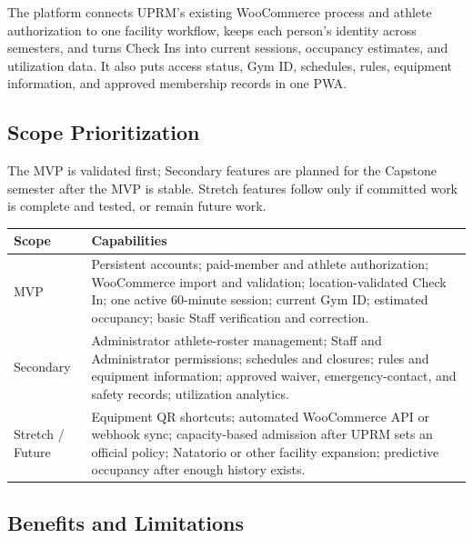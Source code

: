 \documentclass[11pt,letterpaper]{article}
\begin{document}
The platform connects UPRM's existing WooCommerce process and athlete authorization to one facility workflow, keeps each person's identity across semesters, and turns Check Ins into current sessions, occupancy estimates, and utilization data. It also puts access status, Gym ID, schedules, rules, equipment information, and approved membership records in one PWA.

\subsection{Scope Prioritization}

The MVP is validated first; Secondary features are planned for the Capstone semester after the MVP is stable. Stretch features follow only if committed work is complete and tested, or remain future work.

\begin{center}
\small
\begin{tabularx}{0.95\textwidth}{L{2.4cm} X}
\toprule
\textbf{Scope} & \textbf{Capabilities} \\
\midrule
MVP & Persistent accounts; paid-member and athlete authorization; WooCommerce import and validation; location-validated Check In; one active 60-minute session; current Gym ID; estimated occupancy; basic Staff verification and correction. \\
\addlinespace
Secondary & Administrator athlete-roster management; Staff and Administrator permissions; schedules and closures; rules and equipment information; approved waiver, emergency-contact, and safety records; utilization analytics. \\
\addlinespace
Stretch / Future & Equipment QR shortcuts; automated WooCommerce API or webhook sync; capacity-based admission after UPRM sets an official policy; Natatorio or other facility expansion; predictive occupancy after enough history exists. \\
\bottomrule
\end{tabularx}
\end{center}

\subsection{Benefits and Limitations}
\end{document}
